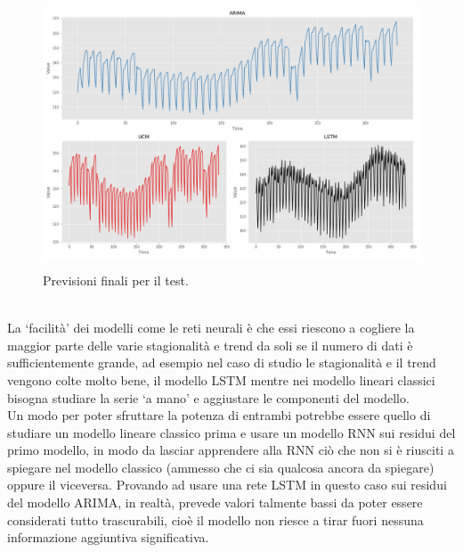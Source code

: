 \documentclass[12pt, onecolumn]{article}
\begin{document}
\begin{figure}[!h]
  \centering
  \includegraphics[width=\linewidth,height=8cm]{imgs/test_results.png}
  \caption{Previsioni finali per il test.}
  \label{fig:test_pred}
\end{figure}\\
La `facilità' dei modelli come le reti neurali è che essi riescono a cogliere la maggior parte delle varie stagionalità e trend da soli se il numero di dati è sufficientemente grande, ad esempio nel caso di studio le stagionalità e il trend vengono colte molto bene, il modello LSTM mentre nei modello lineari classici bisogna studiare la serie `a mano' e aggiustare le componenti del modello.\\
Un modo per poter sfruttare la potenza di entrambi potrebbe essere quello di studiare un modello lineare classico prima e usare un modello RNN sui residui del primo modello, in modo da lasciar apprendere alla RNN ciò che non si è riusciti a spiegare nel modello classico (ammesso che ci sia qualcosa ancora da spiegare) oppure il viceversa.
Provando ad usare una rete LSTM in questo caso sui residui del modello ARIMA, in realtà, prevede valori talmente bassi da poter essere considerati tutto trascurabili, cioè il modello non riesce a tirar fuori nessuna informazione aggiuntiva significativa.
\end{document}
